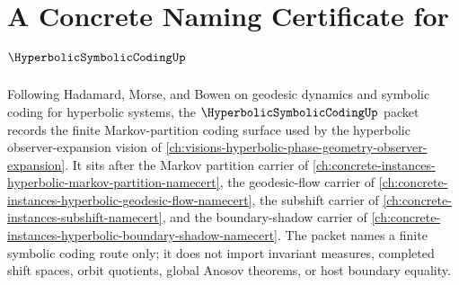 \chapter{A Concrete Naming Certificate for $\HyperbolicSymbolicCodingUp$}
\label{ch:concrete-instances-hyperbolic-symbolic-coding-namecert}

Following Hadamard, Morse, and Bowen on geodesic dynamics and symbolic coding for hyperbolic systems, the $\HyperbolicSymbolicCodingUp$ packet records the finite Markov-partition coding surface used by the hyperbolic observer-expansion vision of \autoref{ch:visions-hyperbolic-phase-geometry-observer-expansion}. It sits after the Markov partition carrier of \autoref{ch:concrete-instances-hyperbolic-markov-partition-namecert}, the geodesic-flow carrier of \autoref{ch:concrete-instances-hyperbolic-geodesic-flow-namecert}, the subshift carrier of \autoref{ch:concrete-instances-subshift-namecert}, and the boundary-shadow carrier of \autoref{ch:concrete-instances-hyperbolic-boundary-shadow-namecert}. The packet names a finite symbolic coding route only; it does not import invariant measures, completed shift spaces, orbit quotients, global Anosov theorems, or host boundary equality.

